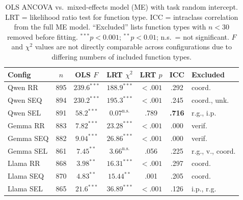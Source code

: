 \begin{table}[htbp]
\centering
\caption{OLS ANCOVA vs.\ mixed-effects model (ME) with task random intercept. LRT = likelihood ratio test for function type. ICC = intraclass correlation from the full ME model. ``Excluded'' lists function types with $n < 30$ removed before fitting. $^{***}p < 0.001$; $^{**}p < 0.01$; n.s.\ = not significant. $F$ and $\chi^2$ values are not directly comparable across configurations due to differing numbers of included function types.}
\label{tab:mixed_effects}
\small
\begin{tabular}{lcccccl}
\toprule
\textbf{Config} & $n$ & \textbf{OLS $F$} & \textbf{LRT $\chi^2$} & \textbf{LRT $p$} & \textbf{ICC} & \textbf{Excluded} \\
\midrule
Qwen RR  & 895 & $239.6^{***}$ & $188.9^{***}$ & ${<}.001$ & .292 & coord. \\
Qwen SEQ & 894 & $230.2^{***}$ & $195.3^{***}$ & ${<}.001$ & .245 & coord., unk. \\
Qwen SEL & 891 & $58.2^{***}$ & $0.07^{\text{n.s.}}$ & .789 & \textbf{.716} & r.g., i.p. \\
\midrule
Gemma RR  & 883 & $7.82^{***}$ & $23.28^{***}$ & ${<}.001$ & .000 & verif. \\
Gemma SEQ & 882 & $9.04^{***}$ & $26.86^{***}$ & ${<}.001$ & .000 & verif. \\
Gemma SEL & 861 & $7.45^{**}$ & $3.66^{\text{n.s.}}$ & .056 & .225 & r.g., v., coord. \\
\midrule
Llama RR  & 868 & $3.98^{**}$ & $16.31^{***}$ & ${<}.001$ & .297 & coord. \\
Llama SEQ & 870 & $4.83^{**}$ & $15.44^{**}$ & .001 & .205 & coord. \\
Llama SEL & 865 & $21.6^{***}$ & $36.89^{***}$ & ${<}.001$ & .126 & i.p., r.g. \\
\bottomrule
\end{tabular}
\end{table}

